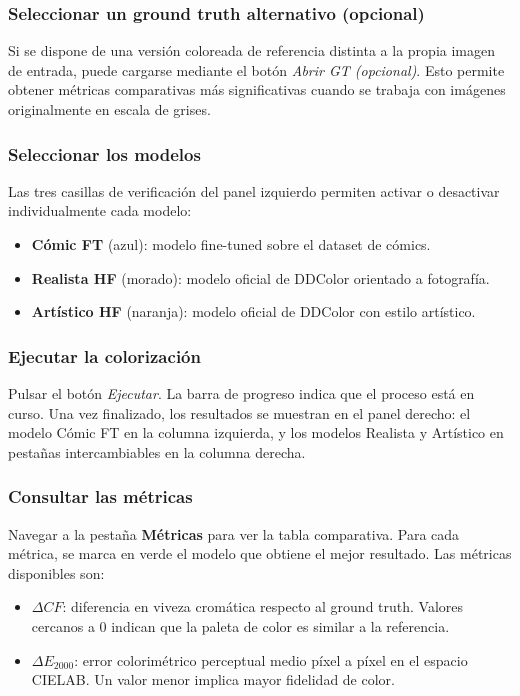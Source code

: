 \documentclass[a4paper]{article}
\begin{document}
\subsubsection{Seleccionar un ground truth alternativo (opcional)}

Si se dispone de una versión coloreada de referencia distinta a la propia imagen de entrada, puede cargarse mediante el botón \textit{Abrir GT (opcional)}. Esto permite obtener métricas comparativas más significativas cuando se trabaja con imágenes originalmente en escala de grises.

\subsubsection{Seleccionar los modelos}

Las tres casillas de verificación del panel izquierdo permiten activar o desactivar individualmente cada modelo:

\begin{itemize}
  \item \textbf{Cómic FT} (azul): modelo fine-tuned sobre el dataset de cómics.
  \item \textbf{Realista HF} (morado): modelo oficial de DDColor orientado a fotografía.
  \item \textbf{Artístico HF} (naranja): modelo oficial de DDColor con estilo artístico.
\end{itemize}

\subsubsection{Ejecutar la colorización}

Pulsar el botón \textit{Ejecutar}. La barra de progreso indica que el proceso está en curso. Una vez finalizado, los resultados se muestran en el panel derecho: el modelo Cómic FT en la columna izquierda, y los modelos Realista y Artístico en pestañas intercambiables en la columna derecha.

\subsubsection{Consultar las métricas}

Navegar a la pestaña \textbf{Métricas} para ver la tabla comparativa. Para cada métrica, se marca en verde el modelo que obtiene el mejor resultado. Las métricas disponibles son:

\begin{itemize}
  \item $\Delta CF$: diferencia en viveza cromática respecto al ground truth. Valores cercanos a 0 indican que la paleta de color es similar a la referencia.
  \item $\Delta E_{2000}$: error colorimétrico perceptual medio píxel a píxel en el espacio CIELAB. Un valor menor implica mayor fidelidad de color.
\end{itemize}
\end{document}
